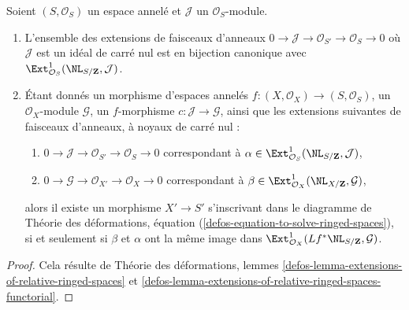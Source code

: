 \begin{lemma}
\label{lemma-extensions-of-ringed-spaces}
Soient $(S, \mathcal{O}_S)$ un espace annelé et $\mathcal{J}$
un $\mathcal{O}_S$-module.
\begin{enumerate}
\item L'ensemble des extensions de faisceaux d'anneaux
$0 \to \mathcal{J} \to \mathcal{O}_{S'} \to \mathcal{O}_S \to 0$
où $\mathcal{J}$ est un idéal de carré nul est en bijection canonique avec
$\Ext^1_{\mathcal{O}_S}(\NL_{S/\mathbf{Z}}, \mathcal{J})$.
\item Étant donnés un morphisme d'espaces annelés
$f : (X, \mathcal{O}_X) \to (S, \mathcal{O}_S)$, un $\mathcal{O}_X$-module
$\mathcal{G}$, un $f$-morphisme $c : \mathcal{J} \to \mathcal{G}$, ainsi que
les extensions suivantes de faisceaux d'anneaux, à noyaux de carré nul :
\begin{enumerate}
\item[(a)] $0 \to \mathcal{J} \to \mathcal{O}_{S'} \to \mathcal{O}_S \to 0$
correspondant à
$\alpha \in \Ext^1_{\mathcal{O}_S}(\NL_{S/\mathbf{Z}}, \mathcal{J})$,
\item[(b)] $0 \to \mathcal{G} \to \mathcal{O}_{X'} \to \mathcal{O}_X \to 0$
correspondant à
$\beta \in \Ext^1_{\mathcal{O}_X}(\NL_{X/\mathbf{Z}}, \mathcal{G})$,
\end{enumerate}
alors il existe un morphisme $X' \to S'$ s'inscrivant dans
le diagramme de Théorie des déformations, équation
(\ref{defos-equation-to-solve-ringed-spaces}),
si et seulement si $\beta$ et $\alpha$
ont la même image dans
$\Ext^1_{\mathcal{O}_X}(Lf^*\NL_{S/\mathbf{Z}}, \mathcal{G})$.
\end{enumerate}
\end{lemma}

\begin{proof}
Cela résulte de Théorie des déformations, lemmes
\ref{defos-lemma-extensions-of-relative-ringed-spaces} et
\ref{defos-lemma-extensions-of-relative-ringed-spaces-functorial}.
\end{proof}

